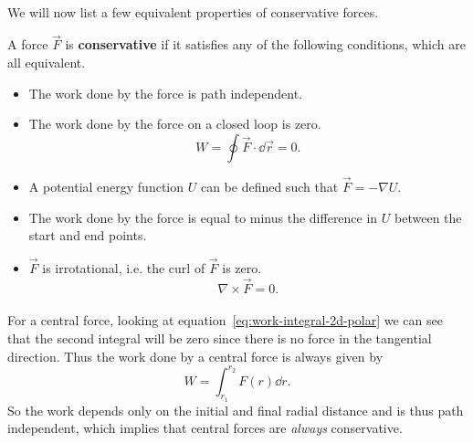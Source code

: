 \documentclass[../classical_mechanics.tex]{subfiles}
\begin{document}
        \paragraph{}
        We will now list a few equivalent properties of conservative forces.
        \begin{definition}\label{def:conservative-force}
            A force $\vec{F}$ is \textbf{conservative} if it satisfies any of the following conditions, which are all equivalent.
            \begin{itemize}
                \item The work done by the force is path independent.
                \item The work done by the force on a closed loop is zero.
                \begin{equation}
                    W=\oint\vec{F}\cdot\dd{\vec{r}}=0.
                \end{equation}
                \item A potential energy function $U$ can be defined such that $\vec{F}=-\nabla U$.
                \item The work done by the force is equal to minus the difference in $U$ between the start and end points.
                \item $\vec{F}$ is irrotational, i.e. the curl of $\vec{F}$ is zero.
                \begin{equation}
                    \nabla\times\vec{F}=0.
                \end{equation}
            \end{itemize}
        \end{definition}

        \paragraph{}
        For a central force, looking at equation~\ref{eq:work-integral-2d-polar} we can see that the second integral will be zero since there is no force in the tangential direction.
        Thus the work done by a central force is always given by
        \begin{equation}
            W=\int_{r_1}^{r_2}F(r)\dd{r}.
        \end{equation}
        So the work depends only on the initial and final radial distance and is thus path independent, which implies that central forces are \textit{always} conservative.
\end{document}
